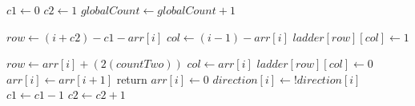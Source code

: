 \begin{algorithm}
  \begin{algorithmic}[1]

      \State $c1 \gets 0$
      \State $c2 \gets 1$
        \State $globalCount \gets globalCount + 1$

            \State $row \gets (i + c2) - c1 - arr[i]$
            \State $col \gets (i - 1) - arr[i]$
            \State $ladder[row][col] \gets 1$

          \Else
            \State $row \gets  arr[i] + (2(countTwo))$
            \State $col \gets arr[i]$
            \State $ladder[row][col] \gets 0$
          \EndIf
          \State $arr[i]\gets arr[i+1]$
          \State return
        \Else 
          \State $arr[i] \gets 0$
          \State $direction[i] \gets !direction[i]$
        \EndIf
        $c1 \gets c1 - 1$
        $c2 \gets c2 + 1$
      \EndFor
      \EndFunction
  \end{algorithmic}
\end{algorithm}

